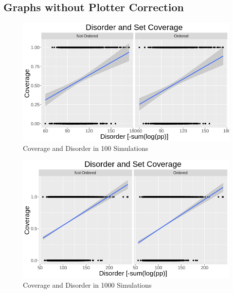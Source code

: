 \subsection{Graphs without Plotter Correction}
\begin{figure}[H]
\centering
\includegraphics[scale=0.5]{images/Coverage_and_Disorder_Charts/Cov_100_sim.png}
\caption{Coverage and Disorder in  100 Simulations}
\label{100_sim}
\end{figure}




\begin{figure}[H]
\centering
\includegraphics[scale=0.5]{images/Coverage_and_Disorder_Charts/Cov_1000_sim.png}
\caption{Coverage and Disorder in  1000 Simulations}
\label{1000_sim}
\end{figure}
